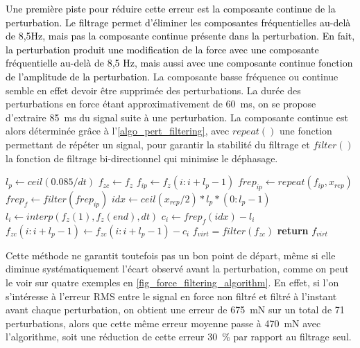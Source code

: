 \textcolor{black}{Une première piste pour réduire cette erreur est la composante continue de la perturbation. Le filtrage permet d'éliminer les composantes fréquentielles au-delà de 8,5Hz, mais pas la composante continue présente dans la perturbation. En fait, la perturbation produit une modification de la force avec une composante fréquentielle au-delà de 8,5 Hz, mais aussi avec une composante continue fonction de l'amplitude de la perturbation.} %
La composante basse fréquence ou continue semble en effet devoir être supprimée des perturbations. 
La durée des perturbations en force étant approximativement de \SI{60}{\milli\second}, on se propose d'extraire \SI{85}{\milli\second} du signal suite à une perturbation. La composante continue est alors déterminée grâce à l'\cref{algo_pert_filtering}, avec $repeat()$ une fonction permettant de répéter un signal, pour garantir la stabilité du filtrage et $filter()$ la fonction de filtrage bi-directionnel qui minimise le déphasage.

\begin{algorithm}
	\caption{Extraction des perturbations par filtrage}\label{algo_pert_filtering}
	\begin{algorithmic}[1]
		\State $l_p \gets ceil(0.085/dt)$
		\State $f_{zc} \gets f_z$
		\State $f_{ip} \gets f_z(i:i+l_p-1)$
		\State $frep_{ip} \gets repeat(f_{ip}, x_{rep})$
		\State $frep_f \gets filter(frep_{ip})$
		\State $idx \gets ceil(x_{rep}/2)*l_p*(0:l_p-1)$
		\State $l_i \gets interp(f_z(1), f_z(end), dt)$
		\State $c_i \gets frep_f(idx) - l_i$
		\State $f_{zc}(i:i+l_p-1) \gets f_{zc}(i:i+l_p-1) - c_i $
		\EndFor
		\State $f_{virt} = filter(f_{zc})$
		\State \textbf{return} $f_{virt}$
		\EndProcedure
	\end{algorithmic}
\end{algorithm}

Cette méthode ne garantit toutefois pas un bon point de départ, même si elle diminue systématiquement l'écart observé avant la perturbation, comme on peut le voir sur quatre exemples en \cref{fig_force_filtering_algorithm}. En effet, si l'on s'intéresse à l'erreur RMS entre le signal en force non filtré et filtré à l'instant avant chaque perturbation, on obtient une erreur de \SI{675}{\milli\newton} sur un total de 71 perturbations, alors que cette même erreur moyenne passe à \SI{470}{\milli\newton} avec l'algorithme, soit une réduction de cette erreur \SI{30}{\percent} par rapport au filtrage seul.

